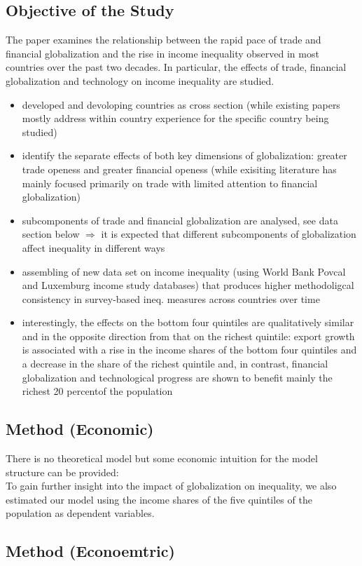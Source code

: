 \documentclass[a4paper,12pt]{scrartcl} %
\begin{document}
\subsection{Objective of the Study}
The paper examines the relationship between the rapid pace of trade and financial globalization and the rise in income inequality observed in most countries over the past two decades. In particular, the effects of trade, financial globalization and technology on income inequality are studied.
\begin{itemize}
\item developed and devoloping countries as cross section (while existing papers mostly address within country experience for the specific country being studied)
\item identify the separate effects of both key dimensions of globalization: greater trade openess and greater financial openess (while exisiting literature has mainly focused primarily on trade with limited attention to financial globalization)
\item subcomponents of trade and financial globalization are analysed, see data section below $\Rightarrow$ it is expected that different subcomponents of globalization affect inequality in different ways
\item assembling of new data set on income inequality (using World Bank Povcal and Luxemburg income study databases) that produces higher methodoligcal consistency in survey-based ineq. measures across countries over time
\item interestingly, the effects on the bottom four quintiles are qualitatively similar and in the opposite direction from that on the richest quintile: export growth is associated with a rise in the income shares of the bottom four quintiles and a decrease
in the share of the richest quintile and, in contrast, financial globalization and technological progress are shown to benefit mainly the richest 20 percentof the population
\end{itemize}
\subsection{Method (Economic)}
There is no theoretical model but some economic intuition for the model structure can be provided:\\
To gain further insight into the impact of globalization on inequality, we also estimated our model using the income shares of the five quintiles of the population as dependent variables. 
\subsection{Method (Econoemtric)}
\end{document}
